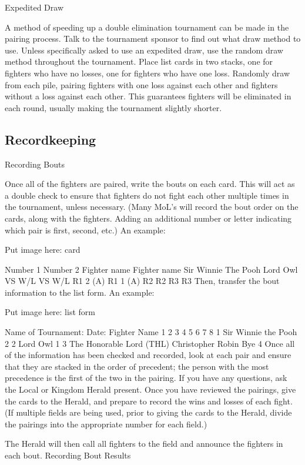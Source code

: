 \documentclass{article}
\begin{document}
Expedited Draw

A method of speeding up a double elimination tournament can be made in the pairing process. Talk to the
tournament sponsor to find out what draw method to use. Unless specifically asked to use an expedited
draw, use the random draw method throughout the tournament.
Place list cards in two stacks, one for fighters who have no losses, one for fighters who have one loss.
Randomly draw from each pile, pairing fighters with one loss against each other and fighters without a
loss against each other. This guarantees fighters will be eliminated in each round, usually making the
tournament slightly shorter.


\subsection{Recordkeeping}
Recording Bouts

Once all of the fighters are paired, write the bouts on each card. This will act as a double check to ensure
that fighters do not fight each other multiple times in the tournament, unless necessary. (Many MoL’s will
record the bout order on the cards, along with the fighters. Adding an additional number or letter
indicating which pair is first, second, etc.) An example:

Put image here: card

Number 1 Number 2
Fighter name Fighter name
Sir
Winnie The Pooh Lord Owl
VS W/L VS W/L
R1 2 (A) R1 1 (A)
R2 R2
R3 R3
Then, transfer the bout information to the list form. An example:

Put image here: list form

Name of Tournament: Date:
Fighter Name 1 2 3 4 5 6 7 8
1 Sir Winnie the Pooh 2
2 Lord Owl 1
3
The Honorable Lord (THL)
Christopher Robin Bye
4
Once all of the information has been checked and recorded, look at each pair and ensure that they are
stacked in the order of precedent; the person with the most precedence is the first of the two in the pairing.
If you have any questions, ask the Local or Kingdom Herald present. Once you have reviewed the
pairings, give the cards to the Herald, and prepare to record the wins and losses of each fight. (If multiple
fields are being used, prior to giving the cards to the Herald, divide the pairings into the appropriate
number for each field.)

The Herald will then call all fighters to the field and announce the fighters in each bout.
Recording Bout Results
\end{document}
